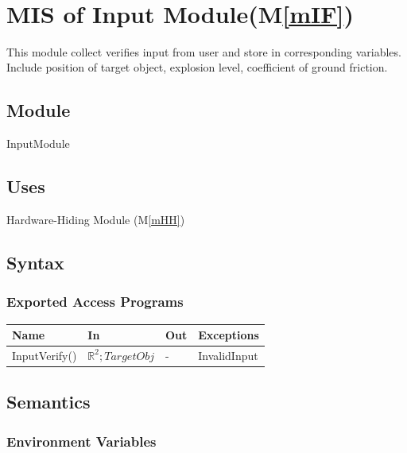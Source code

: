 \documentclass[12pt, titlepage]{article}
\newcommand{\mref}[1]{M\ref{#1}}
\begin{document}

~\newpage

\section{MIS of Input Module(\mref{mIF})} 

This module collect verifies input from user and store in corresponding variables. Include position of target object, explosion level, coefficient of ground friction.

\subsection{Module}

InputModule

\subsection{Uses}

Hardware-Hiding Module (\mref{mHH})
\subsection{Syntax}

\subsubsection{Exported Access Programs}

\begin{center}
\begin{tabular}{p{3cm} p{4cm} p{4cm} p{2cm}}
\hline
\textbf{Name} & \textbf{In} & \textbf{Out} & \textbf{Exceptions} \\
\hline
InputVerify() &  $\mathbb{R}^{2}; TargetObj$ & - & InvalidInput\\
\hline
\end{tabular}
\end{center}

\subsection{Semantics}

\subsubsection{Environment Variables}
\end{document}
